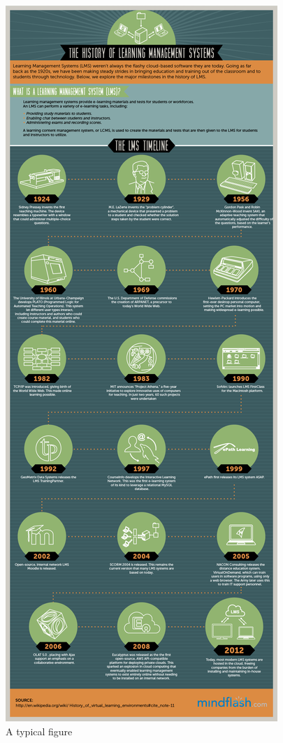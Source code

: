 \documentclass[12pt]{article}
\begin{document}
\begin{figure}[ht]
\centering
\includegraphics[width=.55\textwidth]{history-of-lms.png}
\caption{A typical figure}
\label{fig:exampleFig1}
\end{figure}
\end{document}
